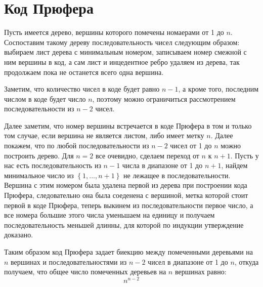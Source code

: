 \section{Код Прюфера}

Пусть имеется дерево, вершины которого помечены номаерами от 1 до $n$. Соспоставим такому дереву последовательность чисел следующим образом: выбираем лист дерева с минимальным номером, записываем номер смежной с ним вершины в код, а сам лист и инцедентное ребро удаляем из дерева, так продолжаем пока не останется всего одна вершина.

Заметим, что количество чисел в коде будет равно $n-1$, а кроме того, последним числом в коде будет число $n$, поэтому можно ограничиться рассмотрением последовательности из $n-2$ чисел.

Далее заметим, что номер вершины встречается в коде Прюфера в том и только том случае, если вершина не является листом, либо имеет метку $n$. Далее покажем, что по любой последовательности из $n-2$ чисел от 1 до $n$ можно построить дерево. Для $n=2$ все очевидно, сделаем переход от $n$ к $n+1$. Пусть у нас есть последовательность из $n-1$ числа в диапазоне от 1 до $n+1$, найдем минимальное число из $\left\{1,...,n+1\right\}$ не лежащее в последовательности. Вершина с этим номером была удалена первой из дерева при построении кода Прюфера, следовательно она была соеденена с вершиной, метка которой стоит первой в коде Прюфера, теперь выкинем из последовательности первое число, а все номера большие этого числа уменьшаем на единицу и получаем последовательность меньшей длинны, для которой по индукции утверждение доказано.

Таким образом код Прюфера задает биекцию между помеченными деревьями на $n$ вершинах и последовательностями из $n-2$ чисел в диапазоне от 1 до $n$, откуда получаем, что общее число помеченных деревьев на $n$ вершинах равно:
\begin{equation}
	n^{n-2}
\end{equation}
